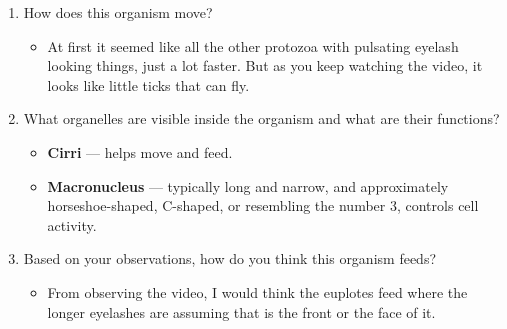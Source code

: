 \documentclass[a4paper]{article}
\begin{document}
\begin{enumerate}
	\item How does this organism move?
	\begin{itemize}
    \item At first it seemed like all the other protozoa with pulsating eyelash looking things, just a lot faster. But as you keep watching the video, it looks like little ticks that can fly.
  \end{itemize}
	\item What organelles are visible inside the organism and what are their functions?
	\begin{itemize}
    \item \textbf{Cirri} — helps move and feed.
    \item \textbf{Macronucleus} — typically long and narrow, and approximately horseshoe-shaped, C-shaped, or resembling the number 3, controls cell activity.
  \end{itemize}
	\item Based on your observations, how do you think this organism feeds?
	\begin{itemize}
    \item From observing the video, I would think the euplotes feed where the longer eyelashes are assuming that is the front or the face of it.
  \end{itemize}
\end{enumerate}
\end{document}
